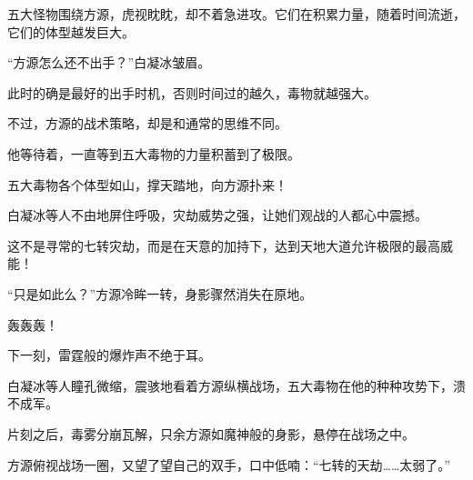 \begin{this_body}
五大怪物围绕方源，虎视眈眈，却不着急进攻。它们在积累力量，随着时间流逝，它们的体型越发巨大。

“方源怎么还不出手？”白凝冰皱眉。

此时的确是最好的出手时机，否则时间过的越久，毒物就越强大。

不过，方源的战术策略，却是和通常的思维不同。

他等待着，一直等到五大毒物的力量积蓄到了极限。

五大毒物各个体型如山，撑天踏地，向方源扑来！

白凝冰等人不由地屏住呼吸，灾劫威势之强，让她们观战的人都心中震撼。

这不是寻常的七转灾劫，而是在天意的加持下，达到天地大道允许极限的最高威能！

“只是如此么？”方源冷眸一转，身影骤然消失在原地。

轰轰轰！

下一刻，雷霆般的爆炸声不绝于耳。

白凝冰等人瞳孔微缩，震骇地看着方源纵横战场，五大毒物在他的种种攻势下，溃不成军。

片刻之后，毒雾分崩瓦解，只余方源如魔神般的身影，悬停在战场之中。

方源俯视战场一圈，又望了望自己的双手，口中低喃：“七转的天劫……太弱了。”

\end{this_body}


